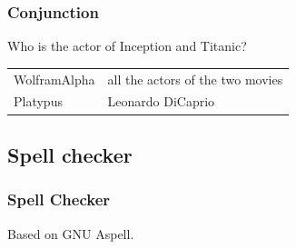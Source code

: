 \begin{frame}[fragile]
    \frametitle{Conjunction}

Who is the actor of Inception and Titanic?
    \begin{tabular}{ll}
        \alert{WolframAlpha} & all the actors of the two movies\\
        \alert{Platypus} & Leonardo DiCaprio\\
    \end{tabular}
\end{frame}

\subsection{Spell checker}

\begin{frame}[fragile]
    \frametitle{Spell Checker}
    Based on \alert{GNU Aspell}.

    \medbreak


    \medbreak

\end{frame}
